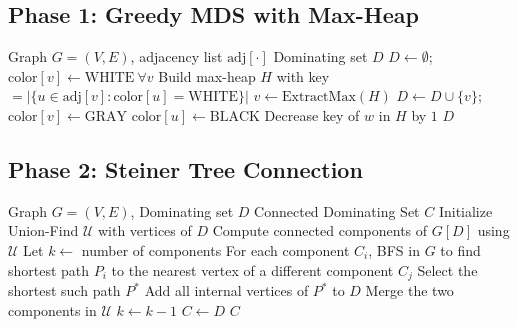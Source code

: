 \documentclass[11pt,a4paper]{article}
\begin{document}
\subsection{Phase 1: Greedy MDS with Max-Heap}

\begin{algorithm}[H]
\caption{Detailed Greedy Dominating Set}\label{alg:phase1_detail}
\begin{algorithmic}[1]
\REQUIRE Graph $G = (V, E)$, adjacency list $\text{adj}[\cdot]$
\ENSURE Dominating set $D$
\STATE $D \leftarrow \emptyset$;\ \ $\text{color}[v] \leftarrow \text{WHITE}\ \forall v$
\STATE Build max-heap $H$ with key $= |\{u \in \text{adj}[v] : \text{color}[u] = \text{WHITE}\}|$
  \STATE $v \leftarrow \text{ExtractMax}(H)$
  \STATE $D \leftarrow D \cup \{v\}$;\ \ $\text{color}[v] \leftarrow \text{GRAY}$
    \STATE $\text{color}[u] \leftarrow \text{BLACK}$
      \STATE Decrease key of $w$ in $H$ by $1$
    \ENDFOR
  \ENDFOR
\ENDWHILE
\RETURN $D$
\end{algorithmic}
\end{algorithm}

\subsection{Phase 2: Steiner Tree Connection}

\begin{algorithm}[H]
\caption{Detailed Steiner Connection}\label{alg:phase2_detail}
\begin{algorithmic}[1]
\REQUIRE Graph $G = (V, E)$, Dominating set $D$
\ENSURE Connected Dominating Set $C$
\STATE Initialize Union-Find $\mathcal{U}$ with vertices of $D$
\STATE Compute connected components of $G[D]$ using $\mathcal{U}$
\STATE Let $k \leftarrow$ number of components
  \STATE For each component $C_i$, BFS in $G$ to find shortest path
         $P_i$ to the nearest vertex of a different component $C_j$
  \STATE Select the shortest such path $P^*$
  \STATE Add all internal vertices of $P^*$ to $D$
  \STATE Merge the two components in $\mathcal{U}$
  \STATE $k \leftarrow k - 1$
\ENDWHILE
\STATE $C \leftarrow D$
\RETURN $C$
\end{algorithmic}
\end{algorithm}
\end{document}
